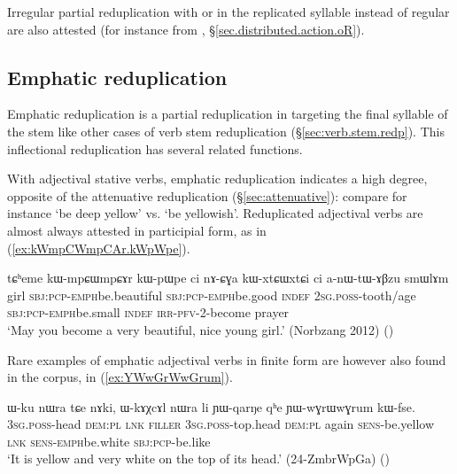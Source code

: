 Irregular partial reduplication with  or  in the replicated syllable instead of regular   are also attested (for instance  from  , §\ref{sec.distributed.action.oR}).
 
\subsection{Emphatic reduplication} \label{sec:emph.redp}
Emphatic reduplication is a partial reduplication in  targeting the final syllable of the stem like other cases of verb stem reduplication (§\ref{sec:verb.stem.redp}). This inflectional reduplication has several related functions.

With adjectival stative verbs,  emphatic reduplication indicates a high degree, opposite of the attenuative reduplication (§\ref{sec:attenuative}): compare for instance  `be deep yellow' vs.  `be yellowish'. Reduplicated adjectival verbs are almost always attested in participial form, as in (\ref{ex:kWmpCWmpCAr.kWpWpe}). 


\begin{exe}
\ex \label{ex:kWmpCWmpCAr.kWpWpe}
\gll tɕʰeme kɯ-mpɕɯ\redp{}mpɕɤr kɯ-pɯ\redp{}pe ci nɤ-ɕɣa  kɯ-xtɕɯ\redp{}xtɕi ci a-nɯ-tɯ-ɤβzu smɯlɤm \\
girl \textsc{sbj}:\textsc{pcp}-\textsc{emph}\redp{}be.beautiful \textsc{sbj}:\textsc{pcp}-\textsc{emph}\redp{}be.good \textsc{indef} \textsc{2sg}.\textsc{poss}-tooth/age  \textsc{sbj}:\textsc{pcp}-\textsc{emph}\redp{}be.small \textsc{indef} \textsc{irr}-\textsc{pfv}-2-become prayer \\
\glt `May you become a very beautiful, nice young girl.' (Norbzang 2012) ()
\end{exe}

Rare examples of emphatic adjectival verbs in finite form are however also found in the corpus, in (\ref{ex:YWwGrWwGrum}).

\begin{exe}
\ex \label{ex:YWwGrWwGrum}
\gll ɯ-ku nɯra tɕe nɤki, ɯ-kɤχcɤl nɯra li ɲɯ-qarŋe qʰe ɲɯ-wɣrɯ\redp{}wɣrum kɯ-fse. \\
\textsc{3sg}.\textsc{poss}-head \textsc{dem}:\textsc{pl} \textsc{lnk} \textsc{filler} \textsc{3sg}.\textsc{poss}-top.head  \textsc{dem}:\textsc{pl} again \textsc{sens}-be.yellow \textsc{lnk} \textsc{sens}-\textsc{emph}\redp{}be.white \textsc{sbj}:\textsc{pcp}-be.like \\
\glt `It is yellow and very white on the top of its head.' (24-ZmbrWpGa)
()
\end{exe}


